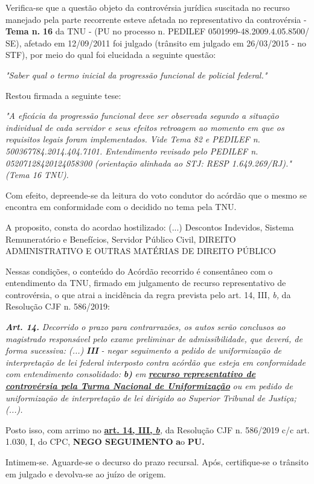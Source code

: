 \documentclass[12pt]{article}
\begin{document}
\justifying
\noindent Verifica-se que a questão objeto da controvérsia jurídica suscitada no recurso manejado pela parte recorrente esteve afetada no representativo da controvérsia - \textbf{Tema n. }\textbf{16} da TNU - (PU no processo n. PEDILEF 0501999-48.2009.4.05.8500/ SE),  afetado em 12/09/2011 foi julgado (trânsito em julgado em 26/03/2015 - no STF), por meio do qual foi elucidada a seguinte questão:

\noindent \textit{"Saber qual o termo inicial da progressão funcional de policial federal."}

\noindent Restou firmada a seguinte tese:

\noindent \textit{"A eficácia da progressão funcional deve ser observada segundo a situação individual de cada servidor e seus efeitos retroagem ao momento em que os requisitos legais foram implementados. Vide Tema 82 e PEDILEF n. 500367784.2014.404.7101. Entendimento revisado pelo PEDILEF n. 05207128420124058300 (orientação alinhada ao STJ: RESP 1.649.269/RJ)." (Tema 16 TNU).}

\noindent Com efeito, depreende-se da leitura do voto condutor do acórdão que o mesmo se encontra em conformidade com o decidido no  tema pela TNU.

\noindent A proposito, consta do acordao hostilizado: (...) Descontos Indevidos, Sistema Remuneratório e Benefícios, Servidor Público Civil, DIREITO ADMINISTRATIVO E OUTRAS MATÉRIAS DE DIREITO PÚBLICO

\noindent Nessas condições, o conteúdo do Acórdão recorrido é consentâneo com o entendimento da TNU, firmado em julgamento de recurso representativo de controvérsia, o que atrai a incidência da regra prevista pelo art. 14, III, \textit{b,} da Resolução CJF n. 586/2019:

\noindent \textit{\textbf{Art. 14.}}\textit{ Decorrido o prazo para contrarrazões, os autos serão conclusos ao magistrado responsável pelo exame preliminar de admissibilidade, que deverá, de forma sucessiva: (...) }\textit{\textbf{III }}\textit{- negar seguimento a pedido de uniformização de interpretação de lei federal interposto contra acórdão que esteja em conformidade com entendimento consolidado: }\textit{\textbf{b)}}\textit{ em }\uline{\textit{\textbf{recurso representativo de controvérsia pela Turma Nacional de Uniformização}}}\textit{ ou em pedido de uniformização de interpretação de lei dirigido ao Superior Tribunal de Justiça;(...).}

\noindent Posto isso, com arrimo no \uline{\textbf{art. 14, III, }}\uline{\textit{\textbf{b}}}\textit{,} da Resolução CJF n. 586/2019 c/c art. 1.030, I, do CPC, \textbf{NEGO SEGUIMENTO }\textbf{a}o\textbf{ PU}\textbf{.}

\noindent Intimem-se. Aguarde-se o decurso do prazo recursal. Após, certifique-se o trânsito em julgado e devolva-se ao juízo de origem.
\end{document}
